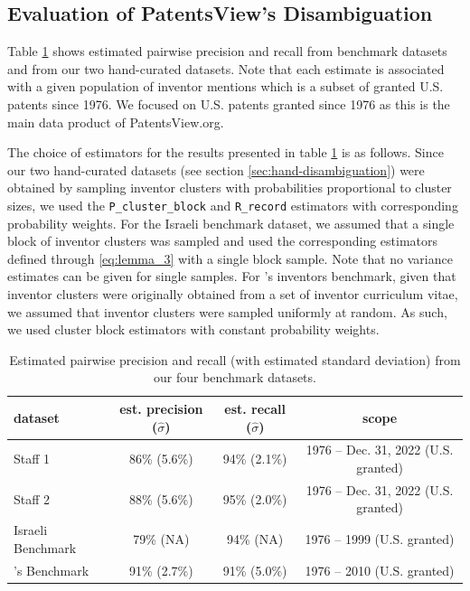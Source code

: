 \documentclass[fontsize=11pt]{article}
\theoremstyle{definition}
\begin{document}
\subsection{Evaluation of PatentsView's Disambiguation}

Table \ref{tab:results} shows estimated pairwise precision and recall from benchmark datasets and from our two hand-curated datasets. Note that each estimate is associated with a given population of inventor mentions which is a subset of granted U.S. patents since 1976. We focused on U.S. patents granted since 1976 as this is the main data product of PatentsView.org.

The choice of estimators for the results presented in table \ref{tab:results} is as follows.
Since our two hand-curated datasets (see section \ref{sec:hand-disambiguation}) were obtained by sampling inventor clusters with probabilities proportional to cluster sizes, we used the \texttt{P\_cluster\_block} and \texttt{R\_record} estimators with corresponding probability weights. 
For the Israeli benchmark dataset, we assumed that a single block of inventor clusters was sampled and used the corresponding estimators defined through \eqref{eq:lemma_3} with a single block sample. Note that no variance estimates can be given for single samples.
For \cite{Li2014}'s inventors benchmark, given that inventor clusters were originally obtained from a set of inventor curriculum vitae, we assumed that inventor clusters were sampled uniformly at random. As such, we used cluster block estimators with constant probability weights.

\begin{table}
    \centering
    \caption{\centering Estimated pairwise precision and recall (with estimated standard deviation) from our four benchmark datasets.}
    \label{tab:results}
    \begin{tabular}{lccc}
    \toprule
    \textbf{dataset} & \textbf{est. precision ($\hat \sigma$)} & \textbf{est. recall ($\hat \sigma$)} & \textbf{scope} \\
    \midrule
    Staff 1 & 86\% (5.6\%) & 94\% (2.1\%)  & 1976 -- Dec. 31, 2022 (U.S. granted)\\
    Staff 2 & 88\% (5.6\%) & 95\% (2.0\%) & 1976 -- Dec. 31, 2022 (U.S. granted)\\
    Israeli Benchmark & 79\% (NA) & 94\% (NA) & 1976 -- 1999 (U.S. granted)\\
    \cite{Li2014}'s Benchmark & 91\% (2.7\%) & 91\% (5.0\%) & 1976 -- 2010 (U.S. granted)\\
    \bottomrule
    \end{tabular}
\end{table}
\end{document}
